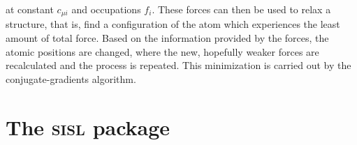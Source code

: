 at constant \(c_{\mu i}\) and occupations \(f_i\). These forces can then be used to relax a structure, that is, find a configuration of the atom which experiences the least amount of total force. Based on the information provided by the forces, the atomic positions are changed, where the new, hopefully weaker forces are recalculated and the process is repeated. This minimization is carried out by the conjugate-gradients algorithm\parencite{Hestenes1952}.






%
%
%
%
%
%
%
\section{The \textsc{sisl} package}

